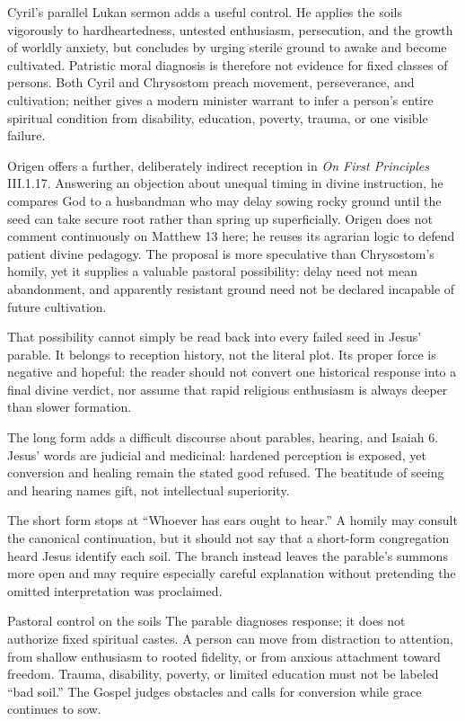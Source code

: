\begin{deepstudy}
Cyril's parallel Lukan sermon adds a useful control. He applies the soils vigorously to hardheartedness, untested enthusiasm, persecution, and the growth of worldly anxiety, but concludes by urging sterile ground to awake and become cultivated. Patristic moral diagnosis is therefore not evidence for fixed classes of persons. Both Cyril and Chrysostom preach movement, perseverance, and cultivation; neither gives a modern minister warrant to infer a person's entire spiritual condition from disability, education, poverty, trauma, or one visible failure.

Origen offers a further, deliberately indirect reception in \emph{On First Principles} III.1.17. Answering an objection about unequal timing in divine instruction, he compares God to a husbandman who may delay sowing rocky ground until the seed can take secure root rather than spring up superficially. Origen does not comment continuously on Matthew 13 here; he reuses its agrarian logic to defend patient divine pedagogy. The proposal is more speculative than Chrysostom's homily, yet it supplies a valuable pastoral possibility: delay need not mean abandonment, and apparently resistant ground need not be declared incapable of future cultivation.

That possibility cannot simply be read back into every failed seed in Jesus' parable. It belongs to reception history, not the literal plot. Its proper force is negative and hopeful: the reader should not convert one historical response into a final divine verdict, nor assume that rapid religious enthusiasm is always deeper than slower formation.

The long form adds a difficult discourse about parables, hearing, and Isaiah 6. Jesus' words are judicial and medicinal: hardened perception is exposed, yet conversion and healing remain the stated good refused. The beatitude of seeing and hearing names gift, not intellectual superiority.

The short form stops at “Whoever has ears ought to hear.” A homily may consult the canonical continuation, but it should not say that a short-form congregation heard Jesus identify each soil. The branch instead leaves the parable's summons more open and may require especially careful explanation without pretending the omitted interpretation was proclaimed.

\begin{studybox}{Pastoral control on the soils}
The parable diagnoses response; it does not authorize fixed spiritual castes. A person can move from distraction to attention, from shallow enthusiasm to rooted fidelity, or from anxious attachment toward freedom. Trauma, disability, poverty, or limited education must not be labeled “bad soil.” The Gospel judges obstacles and calls for conversion while grace continues to sow.
\end{studybox}


\end{deepstudy}
